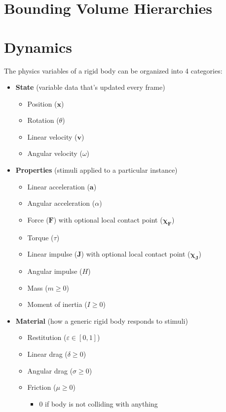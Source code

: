 \documentclass[10pt]{report}
\begin{document}
\section{Bounding Volume Hierarchies}

\section{Dynamics}

The physics variables of a rigid body can be organized into 4 categories:
\begin{itemize}
\item \textbf{State} (variable data that's updated every frame)
\begin{itemize}
\item Position ($\boldsymbol{x}$)
\item Rotation ($\theta$)
\item Linear velocity ($\boldsymbol{v}$)
\item Angular velocity ($\omega$)
\end{itemize}
\item \textbf{Properties} (stimuli applied to a particular instance)
\begin{itemize}
\item Linear acceleration ($\boldsymbol{a}$)
\item Angular acceleration ($\alpha$)
\item Force ($\boldsymbol{F}$) with optional local contact point ($\boldsymbol{\chi}_{\boldsymbol{F}}$)
\item Torque ($\tau$)
\item Linear impulse ($\boldsymbol{J}$) with optional local contact point ($\boldsymbol{\chi}_{\boldsymbol{J}}$)
\item Angular impulse ($H$)
\item Mass ($m\geq0$)
\item Moment of inertia ($I\geq0$)
\end{itemize}
\item \textbf{Material} (how a generic rigid body responds to stimuli)
\begin{itemize}
\item Restitution ($\varepsilon\in[0,1]$)
\item Linear drag ($\delta\geq0$)
\item Angular drag ($\sigma\geq0$)
\item Friction ($\mu\geq0$)
\begin{itemize}
\item 0 if body is not colliding with anything

\end{itemize}
\end{itemize}
\end{itemize}
\end{document}
